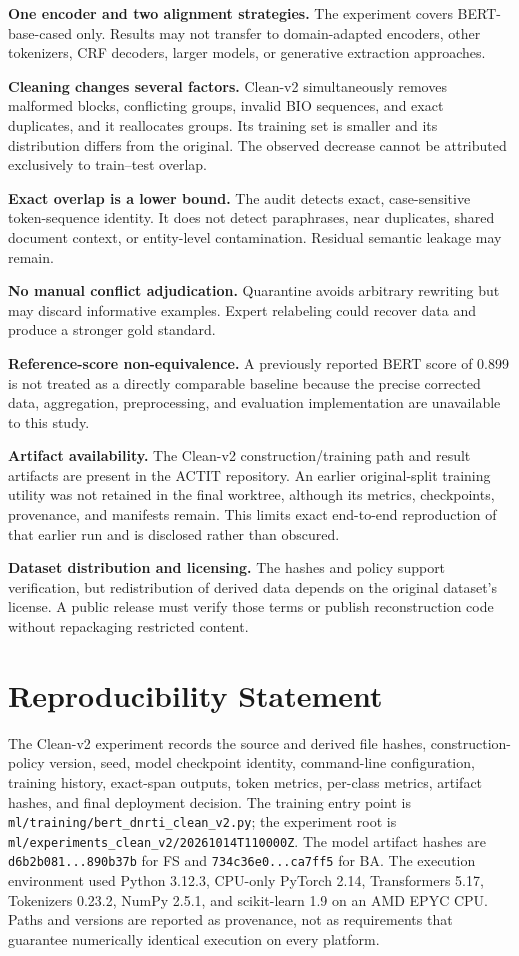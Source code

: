 \documentclass[conference]{IEEEtran}
\begin{document}
\textbf{One encoder and two alignment strategies.} The experiment covers BERT-base-cased only. Results may not transfer to domain-adapted encoders, other tokenizers, CRF decoders, larger models, or generative extraction approaches.

\textbf{Cleaning changes several factors.} Clean-v2 simultaneously removes malformed blocks, conflicting groups, invalid BIO sequences, and exact duplicates, and it reallocates groups. Its training set is smaller and its distribution differs from the original. The observed decrease cannot be attributed exclusively to train--test overlap.

\textbf{Exact overlap is a lower bound.} The audit detects exact, case-sensitive token-sequence identity. It does not detect paraphrases, near duplicates, shared document context, or entity-level contamination. Residual semantic leakage may remain.

\textbf{No manual conflict adjudication.} Quarantine avoids arbitrary rewriting but may discard informative examples. Expert relabeling could recover data and produce a stronger gold standard.

\textbf{Reference-score non-equivalence.} A previously reported BERT score of 0.899 \cite{alazab2025holistic} is not treated as a directly comparable baseline because the precise corrected data, aggregation, preprocessing, and evaluation implementation are unavailable to this study.

\textbf{Artifact availability.} The Clean-v2 construction/training path and result artifacts are present in the ACTIT repository. An earlier original-split training utility was not retained in the final worktree, although its metrics, checkpoints, provenance, and manifests remain. This limits exact end-to-end reproduction of that earlier run and is disclosed rather than obscured.

\textbf{Dataset distribution and licensing.} The hashes and policy support verification, but redistribution of derived data depends on the original dataset's license. A public release must verify those terms or publish reconstruction code without repackaging restricted content.

\section{Reproducibility Statement}
The Clean-v2 experiment records the source and derived file hashes, construction-policy version, seed, model checkpoint identity, command-line configuration, training history, exact-span outputs, token metrics, per-class metrics, artifact hashes, and final deployment decision. The training entry point is \texttt{ml/training/bert\_dnrti\_clean\_v2.py}; the experiment root is \texttt{ml/experiments\_clean\_v2/20261014T110000Z}. The model artifact hashes are \texttt{d6b2b081...890b37b} for FS and \texttt{734c36e0...ca7ff5} for BA. The execution environment used Python 3.12.3, CPU-only PyTorch 2.14, Transformers 5.17, Tokenizers 0.23.2, NumPy 2.5.1, and scikit-learn 1.9 on an AMD EPYC CPU. Paths and versions are reported as provenance, not as requirements that guarantee numerically identical execution on every platform.
\end{document}
